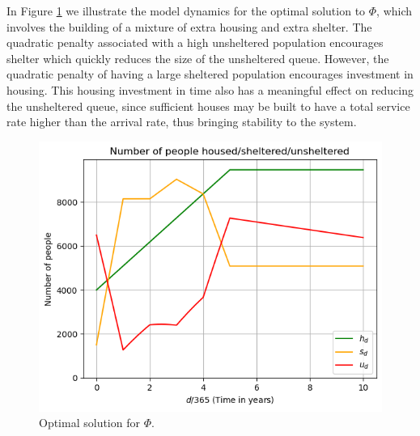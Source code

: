 \documentclass[12pt,a4paper]{article}
\begin{document}
In Figure \ref{fig:phi2opt} we illustrate the model dynamics for the optimal solution to $\Phi$, which involves the building of a mixture of extra housing and extra shelter. The quadratic penalty associated with a high unsheltered population encourages shelter which quickly reduces the size of the unsheltered queue. However, the quadratic penalty of having a large sheltered population encourages investment in housing. This housing investment in time also has a meaningful effect on reducing the unsheltered queue, since sufficient houses may be built to have a total service rate higher than the arrival rate, thus bringing stability to the system. 
%
\begin{figure}[h!]
    \centering
    \includegraphics[scale=0.8]{phi2-opt.png}
    \caption{Optimal solution for $\Phi$.}
    \label{fig:phi2opt}
\end{figure}
\end{document}
